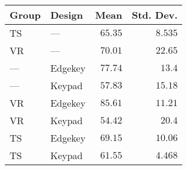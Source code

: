 \begin{tabular}{llrr}
\toprule
Group &   Design &    Mean &  Std. Dev. \\
\midrule
   TS &      --- & $65.35$ &    $8.535$ \\
   VR &      --- & $70.01$ &    $22.65$ \\
  --- &  Edgekey & $77.74$ &     $13.4$ \\
  --- &   Keypad & $57.83$ &    $15.18$ \\
   VR &  Edgekey & $85.61$ &    $11.21$ \\
   VR &   Keypad & $54.42$ &     $20.4$ \\
   TS &  Edgekey & $69.15$ &    $10.06$ \\
   TS &   Keypad & $61.55$ &    $4.468$ \\
\bottomrule
\end{tabular}

